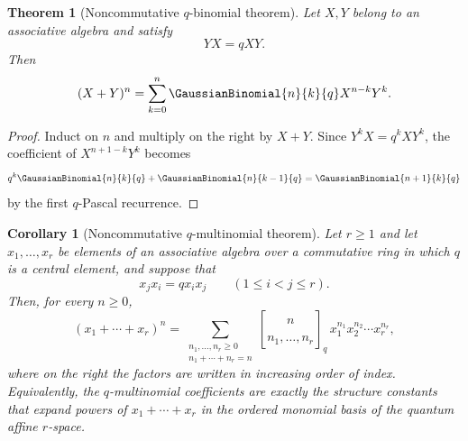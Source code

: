 \documentclass[11pt,a4paper,oneside,openany]{book}
\newtheorem{theorem}{Theorem}[chapter]
\newtheorem{corollary}[corollary]{Corollary}
\theoremstyle{definition}
\theoremstyle{remark}
\newcommand{\qmultinom}[2]{\genfrac{[}{]}{0pt}{}{#1}{#2}_{q}}
\begin{document}
\begin{theorem}[Noncommutative $q$-binomial theorem]\label{thm:quantum-binomial}
Let $X,Y$ belong to an associative algebra and satisfy
\[
 YX=qXY.
\]
Then
\[
 (X+Y)^n=\sum_{k=0}^{n}\GaussianBinomial{n}{k}{q}X^{n-k}Y^k.
\]
\end{theorem}

\begin{proof}
Induct on $n$ and multiply on the right by $X+Y$.  Since $Y^kX=q^kXY^k$, the coefficient of $X^{n+1-k}Y^k$ becomes
\[
 q^k\GaussianBinomial{n}{k}{q}+\GaussianBinomial{n}{k-1}{q}=\GaussianBinomial{n+1}{k}{q}
\]
by the first $q$-Pascal recurrence.
\end{proof}


\begin{corollary}[Noncommutative $q$-multinomial theorem]\label{cor:quantum-multinomial}
Let $r\ge1$ and let $x_1,\dots,x_r$ be elements of an associative algebra over a commutative ring in which $q$ is a central element, and suppose that
\[
 x_jx_i=qx_ix_j
 \qquad(1\le i<j\le r).
\]
Then, for every $n\ge0$,
\[
 (x_1+\cdots+x_r)^n
 =\sum_{\substack{n_1,\dots,n_r\ge0\\ n_1+\cdots+n_r=n}}
 \qmultinom{n}{n_1,\dots,n_r}\,
 x_1^{n_1}x_2^{n_2}\cdots x_r^{n_r},
\]
where on the right the factors are written in increasing order of index.  Equivalently, the $q$-multinomial coefficients are exactly the structure constants that expand powers of $x_1+\cdots+x_r$ in the ordered monomial basis of the quantum affine $r$-space.
\end{corollary}

\end{document}

